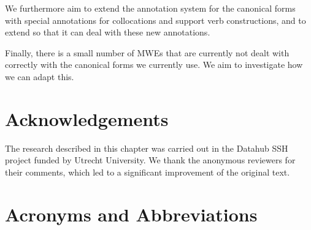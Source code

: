 \documentclass[output=paper,colorlinks,citecolor=brown]{langscibook}
\begin{document}
We furthermore aim to extend the annotation system for the canonical forms with special annotations for collocations and support verb constructions, and to extend {\mwefinder} so that it can deal with these new annotations.

Finally, there is a small number of MWEs that are currently not dealt with correctly with the canonical forms we currently use. We aim to investigate how we can adapt this.

\section*{Acknowledgements}
The research described in this chapter was carried out in the Datahub SSH project funded by Utrecht University. We thank the anonymous reviewers for their comments, which led to  a significant improvement of the original text. 


\section*{Acronyms and Abbreviations}
\label{acronyms}
\end{document}
